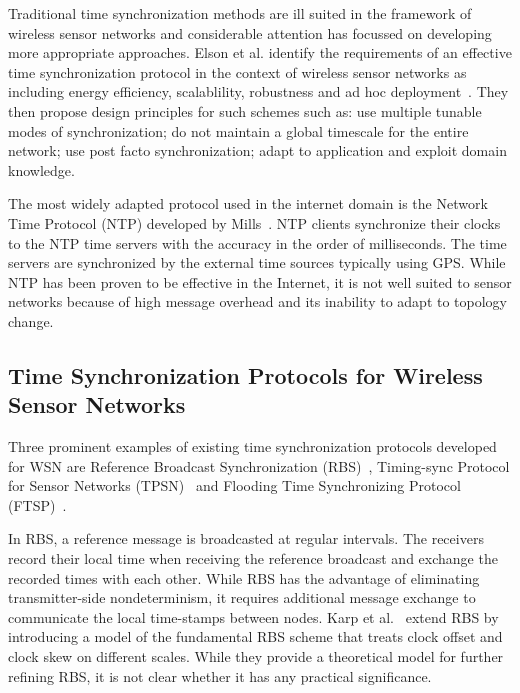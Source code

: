 \documentclass[8pt,twocolumn]{article}
\begin{document}
Traditional time synchronization methods are ill suited in the framework of
wireless sensor networks and considerable attention has focussed on
developing more appropriate approaches.  Elson et al. identify the
requirements of an effective time synchronization protocol in the context of
wireless sensor networks as including energy efficiency, scalablility,
robustness and ad hoc deployment~\cite{wsn02}. They then propose design
principles for such schemes such as: use multiple tunable modes of
synchronization; do not maintain a global timescale for the entire network;
use post facto synchronization; adapt to application and exploit domain
knowledge.

The most widely adapted protocol used in the internet domain is the Network
Time Protocol (NTP) developed by Mills~\cite{mills94}.  NTP clients
synchronize their clocks to the NTP time servers with the accuracy in the
order of milliseconds. The time servers are synchronized by the external time
sources typically using GPS. While NTP has been proven to be effective in the
Internet, it is not well suited to sensor networks because of high message
overhead and its inability to adapt to topology change.

\subsection{Time Synchronization Protocols for Wireless Sensor Networks}

Three prominent examples of existing time synchronization protocols developed
for WSN are Reference Broadcast Synchronization (RBS)~\cite{rbs02},
Timing-sync Protocol for Sensor Networks (TPSN)~\cite{tpsn03} and Flooding
Time Synchronizing Protocol (FTSP)~\cite{ftsp04}. 

In RBS, a reference message is broadcasted at regular intervals.  The
receivers record their local time when receiving the reference broadcast and
exchange the recorded times with each other. While RBS has the advantage of
eliminating transmitter-side nondeterminism, it requires additional message
exchange to communicate the local time-stamps between nodes.  Karp et
al.~\cite{ogts03} extend RBS by introducing a model of the fundamental RBS
scheme that treats clock offset and clock skew on different scales. While
they provide a theoretical model for further refining RBS, it is not clear
whether it has any practical significance.
\end{document}
